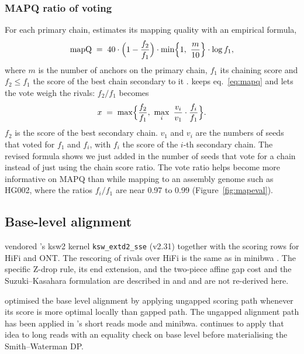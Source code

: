 \subsubsection{MAPQ ratio of voting}
\label{sec:mapq}

For each primary chain, \mmtwo{} estimates its mapping quality with an empirical formula,
\begin{equation}
\text{mapQ} \;=\; 40\cdot\Bigl(1-\frac{f_2}{f_1}\Bigr)\cdot\min\Bigl\{1,\ \frac{m}{10}\Bigr\}\cdot\log f_1,
\label{eq:mapq}
\end{equation}
where $m$ is the number of anchors on the primary chain, $f_1$ its chaining score and $f_2 \le f_1$ the score of the best chain secondary to it \citep[Section~2.1.3]{li2018minimap2}. \flash{} keeps eq.~\eqref{eq:mapq} and lets the vote weigh the rivals: $f_2/f_1$ becomes
\begin{equation}
x \;=\; \max\Bigl\{\frac{f_2}{f_1},\ \max_i\ \frac{v_i}{v_1}\cdot\frac{f_i}{f_1}\Bigr\}.
\label{eq:mapqvote}
\end{equation}
$f_2$ is the score of the best secondary chain. $v_1$ and $v_i$ are the numbers of seeds that voted for $f_1$ and $f_i$, with $f_i$ the score of the $i$-th secondary chain. The revised formula shows we just added in the number of seeds that vote for a chain instead of just using the chain score ratio. The vote ratio helps \flash{} become more informative on MAPQ than \mmtwo{} while mapping to an assembly genome such as HG002, where the ratios $f_i/f_1$ are near 0.97 to 0.99 (Figure~\ref{fig:mapeval}).

\subsection{Base-level alignment}
\label{sec:kernel}

\flash{} vendored \mmtwo{}'s ksw2 kernel \texttt{ksw\_\allowbreak extd2\_\allowbreak sse} (v2.31) together with the \mmtwo{} scoring rows for HiFi and ONT. The rescoring of rivals over HiFi is the same as in minibwa \citep{li2026minibwa}. The specific Z-drop rule, its end extension, and the two-piece affine gap cost and the Suzuki--Kasahara formulation are described in \citet[Section~2.2]{li2018minimap2} and \citet{suzuki2018difference} and are not re-derived here.

\flash{} optimised the base level alignment by applying ungapped scoring path whenever its score is more optimal locally than gapped path. The ungapped alignment path has been applied in \mmtwo{}'s short reads mode and minibwa. \flash{} continues to apply that idea to long reads with an equality check on base level before materialising the Smith--Waterman DP.

